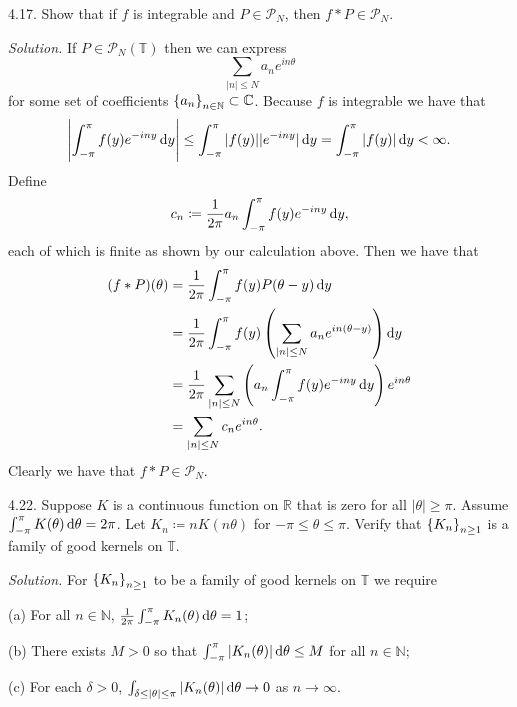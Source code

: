 \documentclass{article}
\newcommand{\Pc}{\mathcal{P}}
\newcommand{\T}{\mathbb{T}}
\newcommand{\C}{\mathbb{C}}
\newcommand{\N}{\mathbb{N}}
\newcommand{\R}{\mathbb{R}}
\begin{document}
\newpage



\newpage

4.17. Show that if $f$ is integrable and $P \in \Pc_N$, then $f * P \in \Pc_N$.

\textit{Solution.}
If $P \in \Pc_N(\T)$ then we can express
%
\begin{equation*}
    \sum_{|n| \leq N} a_n e^{i n \theta}
\end{equation*}
%
for some set of coefficients $\cbr{a_n}_{n \in \N} \subset \C$. Because
$f$ is integrable we have that
%
\begin{equation*}
    \envert{\int_{-\pi}^\pi f(y) e^{-i n y} \dif y}
    \leq \int_{-\pi}^\pi |f(y)| |e^{-i n y}| \dif y
    = \int_{-\pi}^\pi |f(y)| \dif y
    < \infty
    .
\end{equation*}
%
Define
%
\begin{equation*}
    c_n \coloneqq \frac{1}{2 \pi} a_n \int_{-\pi}^\pi f(y) e^{-i n y} \dif y
    ,
\end{equation*}
%
each of which is finite as shown by our calculation above. Then we have that
%
\begin{align*}
    (f * P) (\theta)
        &= \frac{1}{2 \pi} \int_{-\pi}^\pi f(y) P(\theta - y) \dif y \\
        &= \frac{1}{2 \pi} \int_{-\pi}^\pi f(y) \del{\sum_{|n| \leq N} a_n e^{i n (\theta - y)}} \dif y \\
        &= \frac{1}{2 \pi} \sum_{|n| \leq N} \del{a_n  \int_{-\pi}^\pi f(y) e^{-i n y} \dif y} e^{i n \theta} \\
        &= \sum_{|n| \leq N} c_n e^{i n \theta}
        .
\end{align*}
%
Clearly we have that $f * P \in \Pc_N$.

\newpage

4.22. Suppose $K$ is a continuous function on $\R$ that is zero for all
$|\theta| \geq \pi$. Assume $\int_{- \pi}^\pi K(\theta) \dif \theta = 2 \pi$.
Let $K_n \coloneqq n K(n \theta)$ for $- \pi \leq \theta \leq \pi$. Verify
that $\cbr{K_n}_{n \geq 1}$ is a family of good kernels on $\T$.

\textit{Solution.}
For $\cbr{K_n}_{n \geq 1}$ to be a family of good kernels on $\T$ we require

\begin{adjustwidth}{2.5em}{0pt}
    (a) For all $n \in \N$, $\frac{1}{2 \pi} \int_{- \pi}^\pi K_n(\theta) \dif \theta = 1$;

    (b) There exists $M > 0$ so that
    $\int_{- \pi}^\pi |K_n(\theta)| \dif \theta \leq M$ for all $n \in \N$;

    (c) For each $\delta > 0$,
    $\int_{\delta \leq |\theta| \leq \pi} |K_n(\theta)| \dif \theta \to 0$ as $n \to \infty$.
\end{adjustwidth}
\end{document}
